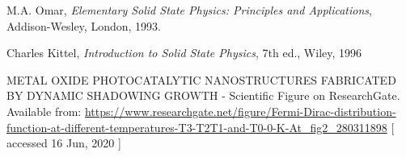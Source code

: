 \begin{thebibliography}{9}
    M.A. Omar, \textit{Elementary Solid State Physics:  
    Principles and Applications}, 
    Addison-Wesley, London, 1993.
    
    Charles Kittel, \textit{Introduction to Solid State Physics}, 7th ed.,
    Wiley, 1996

    METAL OXIDE PHOTOCATALYTIC NANOSTRUCTURES FABRICATED BY DYNAMIC SHADOWING GROWTH - Scientific Figure on ResearchGate. Available from: 
    \url{https://www.researchgate.net/figure/Fermi-Dirac-distribution-function-at-different-temperatures-T3-T2T1-and-T0-0-K-At_fig2_280311898} 
    [ accessed 16 Jun, 2020 ]

\end{thebibliography}